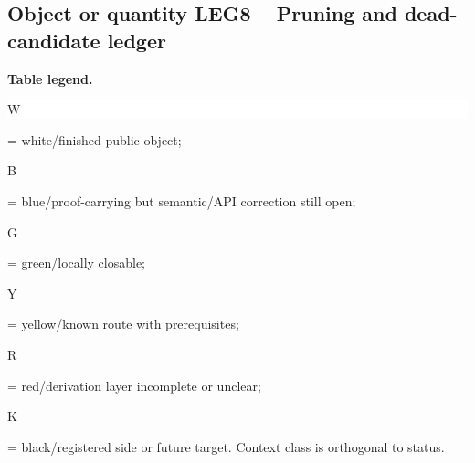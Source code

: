 \subsection*{Object or quantity LEG8 -- Pruning and dead-candidate ledger}
\hypertarget{objproof:LEG8}{}
\par\smallskip\noindent\begin{minipage}{0.99\linewidth}\footnotesize\raggedright\textbf{Table legend.} \colorbox{white}{\strut W} = white/finished public object; \colorbox{cyan!20}{\strut B} = blue/proof-carrying but semantic/API correction still open; \colorbox{green!18}{\strut G} = green/locally closable; \colorbox{yellow!25}{\strut Y} = yellow/known route with prerequisites; \colorbox{red!20}{\strut R} = red/derivation layer incomplete or unclear; \colorbox{black!18}{\strut K} = black/registered side or future target. Context class is orthogonal to status.\end{minipage}\par\vspace{0.25em}
